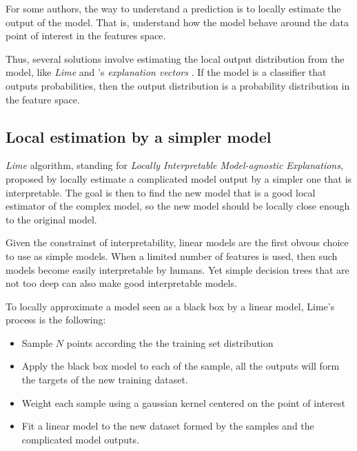 \documentclass[a4paper,11pt]{kth-mag}
\begin{document}
For some authors, the way to understand a prediction is to locally estimate the output of the model. That is, understand how the model behave around the data point of interest in the features space.

Thus, several solutions involve estimating the local output distribution from the model, like \textit{Lime} \cite{lime} and \citeauthor{explvect}'s \textit{explanation vectors} \cite{explvect}. If the model is a classifier that outputs probabilities, then the output distribution is a probability distribution in the feature space. 

\subsection{Local estimation by a simpler model}

\textit{Lime} algorithm, standing for \textit{Locally Interpretable Model-agnostic Explanations}, proposed by \citeauthor{lime} \cite{lime} locally estimate a complicated model output by a simpler one that is interpretable. The goal is then to find the new model that is a good local estimator of the complex model, so the new model should be locally close enough to the original model. 

Given the constrainst of interpretability, linear models are the first obvous choice to use as simple models. When a limited number of features is used, then such models become easily interpretable by humans. Yet simple decision trees that are not too deep can also make good interpretable models.

To locally approximate a model seen as a black box by a linear model, Lime's process is the following:

\begin{itemize}
	\item Sample $N$ points according the the training set distribution
	\item Apply the black box model to each of the sample, all the outputs will form the targets of the new training dataset.
	\item Weight each sample using a gaussian kernel centered on the point of interest
	\item Fit a linear model to the new dataset formed by the samples and the complicated model outputs.
\end{itemize}
\end{document}
